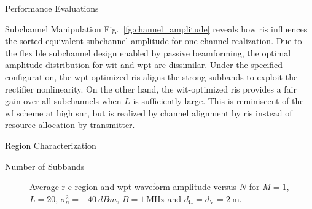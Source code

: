 \begin{section}{Performance Evaluations}
\begin{subsection}{Subchannel Manipulation}
		Fig.~\ref{fg:channel_amplitude} reveals how \gls{ris} influences the sorted equivalent subchannel amplitude for one channel realization. Due to the flexible subchannel design enabled by passive beamforming, the optimal amplitude distribution for \gls{wit} and \gls{wpt} are dissimilar. Under the specified configuration, the \gls{wpt}-optimized \gls{ris} aligns the strong subbands to exploit the rectifier nonlinearity. On the other hand, the \gls{wit}-optimized \gls{ris} provides a fair gain over all subchannels when $L$ is sufficiently large. This is reminiscent of the \gls{wf} scheme at high \gls{snr}, but is realized by channel alignment by \gls{ris} instead of resource allocation by transmitter.
	\end{subsection}

	\begin{subsection}{ Region Characterization}
		\begin{subsubsection}{Number of Subbands}
			\begin{figure}[H]
				\centering
				\caption{Average \gls{r-e} region and \gls{wpt} waveform amplitude versus $N$ for $M=1$, $L=20$, $\sigma_n^2=\qty{-40}{dBm}$, $B=\qty{1}{\MHz}$ and $d_{\mathrm{H}}=d_{\mathrm{V}}=\qty{2}{\meter}$.}
			\end{figure}


\end{subsubsection}
\end{subsection}
\end{section}
